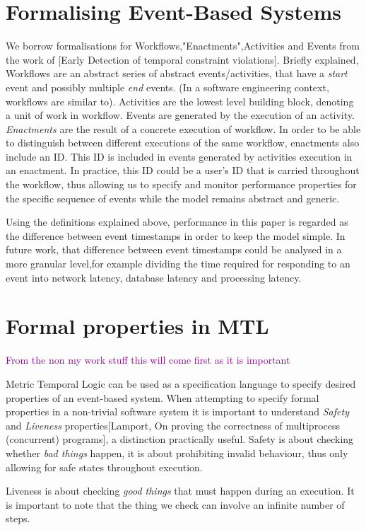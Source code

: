 \documentclass{article}
\newcommand{\note}[1] {
	\textcolor{Purple}{#1}

}
\begin{document}
\section{Formalising Event-Based Systems}
We borrow formalisations for Workflows,"Enactments",Activities and Events from the work of [Early Detection of temporal constraint violations]. Briefly explained, Workflows are an abstract series of abstract events/activities, that have a {\it start} event and possibly multiple {\it end} events. (In a software engineering context, workflows are similar to). Activities are the lowest level building block, denoting a unit of work in workflow. Events are generated by the execution of an activity. {\it Enactments} are the result of a concrete execution of workflow. In order to be able to distinguish between different executions of the same workflow, enactments also include an ID. This ID is included in events generated by activities execution in an enactment. In practice, this ID could be a user's ID that is carried throughout the workflow, thus allowing us to specify and monitor performance properties for the specific sequence of events while the model remains abstract and generic.

\par
Using the definitions explained above, performance in this paper is regarded as the difference between event timestamps
in order to keep the model simple.
In future work, that difference between event timestamps could be analysed in a more granular level,for example dividing the time required for responding to an event into network latency, database latency and processing latency.

\section{Formal properties in MTL}

\note{From the non my work stuff this will come first as it is important}
Metric Temporal Logic can be used as a specification language to specify desired properties of an event-based system.
When attempting to specify formal properties in a non-trivial software system it is important to understand {\it Safety} and {\it Liveness} properties[Lamport, On proving the correctness of multiprocess (concurrent) programs], a distinction practically useful.
Safety is about checking whether {\it bad things} happen, it is about prohibiting invalid behaviour, thus only allowing for safe states throughout execution.

Liveness is about checking {\it good things} that must happen during an execution. It is important to note that the thing we check can involve an infinite number of steps.
\end{document}
